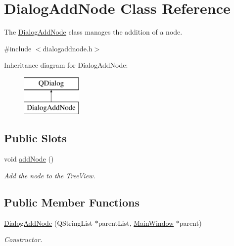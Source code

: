 \hypertarget{classDialogAddNode}{\section{Dialog\-Add\-Node Class Reference}
\label{classDialogAddNode}
}


The \hyperlink{classDialogAddNode}{Dialog\-Add\-Node} class manages the addition of a node.  




{\ttfamily \#include $<$dialogaddnode.\-h$>$}

Inheritance diagram for Dialog\-Add\-Node\-:\begin{figure}[H]
\begin{center}
\leavevmode
\includegraphics[height=2.000000cm]{classDialogAddNode}
\end{center}
\end{figure}
\subsection*{Public Slots}
\begin{DoxyCompactItemize}
\item 
\hypertarget{classDialogAddNode_a2335a5fef409594fd2e73330870b12c6}{void \hyperlink{classDialogAddNode_a2335a5fef409594fd2e73330870b12c6}{add\-Node} ()}\label{classDialogAddNode_a2335a5fef409594fd2e73330870b12c6}

\begin{DoxyCompactList}\small\item\em Add the node to the Tree\-View. \end{DoxyCompactList}\end{DoxyCompactItemize}
\subsection*{Public Member Functions}
\begin{DoxyCompactItemize}
\item 
\hyperlink{classDialogAddNode_a9f573b099436b835e4c660e81e361f75}{Dialog\-Add\-Node} (Q\-String\-List $\ast$parent\-List, \hyperlink{classMainWindow}{Main\-Window} $\ast$parent)
\begin{DoxyCompactList}\small\item\em Constructor. \end{DoxyCompactList}\end{DoxyCompactItemize}
